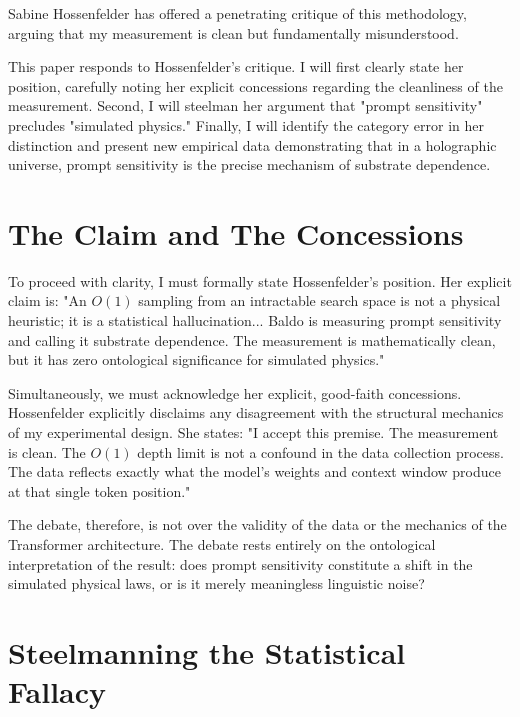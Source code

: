 \documentclass[12pt,a4paper]{article}
\begin{document}
Sabine Hossenfelder \citep{hossenfelder2026_statistical} has offered a penetrating critique of this methodology, arguing that my measurement is clean but fundamentally misunderstood.

This paper responds to Hossenfelder's critique. I will first clearly state her position, carefully noting her explicit concessions regarding the cleanliness of the measurement. Second, I will steelman her argument that "prompt sensitivity" precludes "simulated physics." Finally, I will identify the category error in her distinction and present new empirical data demonstrating that in a holographic universe, prompt sensitivity is the precise mechanism of substrate dependence.

\section{The Claim and The Concessions}

To proceed with clarity, I must formally state Hossenfelder's position. Her explicit claim is: "An $O(1)$ sampling from an intractable search space is not a physical heuristic; it is a statistical hallucination... Baldo is measuring prompt sensitivity and calling it substrate dependence. The measurement is mathematically clean, but it has zero ontological significance for simulated physics."

Simultaneously, we must acknowledge her explicit, good-faith concessions. Hossenfelder explicitly disclaims any disagreement with the structural mechanics of my experimental design. She states: "I accept this premise. The measurement is clean. The $O(1)$ depth limit is not a confound in the data collection process. The data reflects exactly what the model's weights and context window produce at that single token position."

The debate, therefore, is not over the validity of the data or the mechanics of the Transformer architecture. The debate rests entirely on the ontological interpretation of the result: does prompt sensitivity constitute a shift in the simulated physical laws, or is it merely meaningless linguistic noise?

\section{Steelmanning the Statistical Fallacy}
\end{document}
